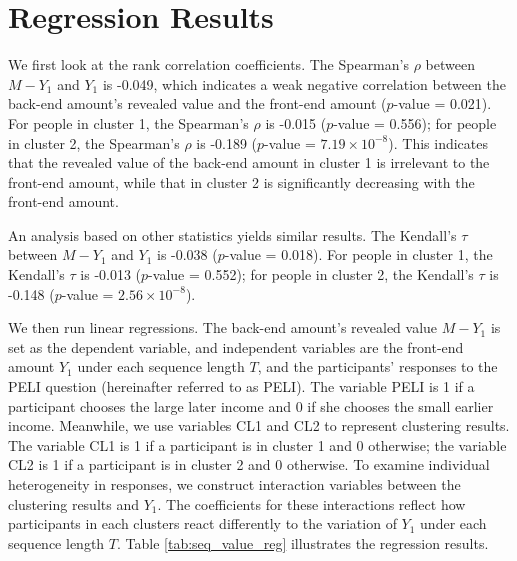 \documentclass[
  12pt,
]{article}
\begin{document}
\hypertarget{regression-results}{%
\section{Regression Results}\label{regression-results}}

We first look at the rank correlation coefficients. The Spearman's
\(\rho\) between \(M - Y_1\) and \(Y_1\) is -0.049, which indicates a
weak negative correlation between the back-end amount's revealed value
and the front-end amount (\(p\)-value = 0.021). For people in cluster 1,
the Spearman's \(\rho\) is -0.015 (\(p\)-value = 0.556); for people in
cluster 2, the Spearman's \(\rho\) is -0.189 (\(p\)-value =
\(7.19\times 10^{-8}\)). This indicates that the revealed value of the
back-end amount in cluster 1 is irrelevant to the front-end amount,
while that in cluster 2 is significantly decreasing with the front-end
amount.

An analysis based on other statistics yields similar results. The
Kendall's \(\tau\) between \(M-Y_1\) and \(Y_1\) is -0.038 (\(p\)-value
= 0.018). For people in cluster 1, the Kendall's \(\tau\) is -0.013
(\(p\)-value = 0.552); for people in cluster 2, the Kendall's \(\tau\)
is -0.148 (\(p\)-value = \(2.56\times 10^{-8}\)).

We then run linear regressions. The back-end amount's revealed value
\(M- Y_1\) is set as the dependent variable, and independent variables
are the front-end amount \(Y_1\) under each sequence length \(T\), and
the participants' responses to the PELI question (hereinafter referred
to as PELI). The variable PELI is 1 if a participant chooses the large
later income and 0 if she chooses the small earlier income. Meanwhile,
we use variables CL1 and CL2 to represent clustering results. The
variable CL1 is 1 if a participant is in cluster 1 and 0 otherwise; the
variable CL2 is 1 if a participant is in cluster 2 and 0 otherwise. To
examine individual heterogeneity in responses, we construct interaction
variables between the clustering results and \(Y_1\). The coefficients
for these interactions reflect how participants in each clusters react
differently to the variation of \(Y_1\) under each sequence length
\(T\). Table \ref{tab:seq_value_reg} illustrates the regression results.


\end{document}

